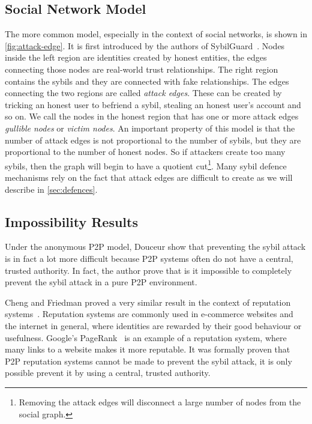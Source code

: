 \subsection{Social Network Model}
The more common model, especially in the context of social networks, is shown in
\autoref{fig:attack-edge}. It is first introduced by the authors of
SybilGuard~\cite{yu2006sybilguard}. Nodes inside the left region are identities
created by honest entities, the edges connecting those nodes are real-world
trust relationships. The right region contains the sybils and they are connected
with fake relationships. The edges connecting the two regions are called
\emph{attack edges}. These can be created by tricking an honest user to befriend
a sybil, stealing an honest user's account and so on. We call the nodes in the
honest region that has one or more attack edges \emph{gullible nodes} or
\emph{victim nodes}. An important property of this model is that the number of
attack edges is not proportional to the number of sybils, but they are
proportional to the number of honest nodes. So if attackers create too many
sybils, then the graph will begin to have a quotient cut\footnote{Removing the
  attack edges will disconnect a large number of nodes from the social graph.}.
Many sybil defence mechanisms rely on the fact that attack edges are difficult
to create as we will describe in \autoref{sec:defences}.

\subsection{Impossibility Results}\label{sec:sybil-theory}
Under the anonymous P2P model, Douceur show that preventing the sybil attack is
in fact a lot more difficult because P2P systems often do not have a central,
trusted authority. In fact, the author prove that is it impossible to completely
prevent the sybil attack in a pure P2P environment.

Cheng and Friedman proved a very similar result in the context of reputation
systems~\cite{cheng2005sybilproof}. Reputation systems are commonly used in
e-commerce websites and the internet in general, where identities are rewarded
by their good behaviour or usefulness. Google's PageRank~\cite{page1999pagerank}
is an example of a reputation system, where many links to a website makes it
more reputable. It was formally proven that P2P reputation systems cannot be
made to prevent the sybil attack, it is only possible prevent it by using a
central, trusted authority.

